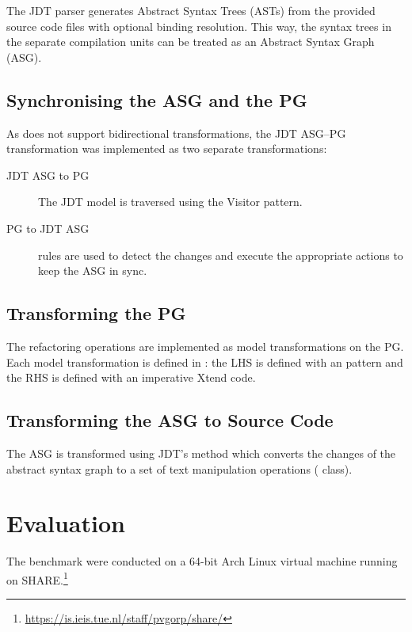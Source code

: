 \documentclass[submission,copyright,creativecommons]{eptcs}
\begin{document}
The JDT parser generates Abstract Syntax Trees (ASTs) from the provided source code files with optional binding resolution. This way, the syntax trees in the separate compilation units can be treated as an Abstract Syntax Graph (ASG).


\subsection{Synchronising the ASG and the PG}

As \viatra does not support bidirectional transformations, the JDT ASG--PG transformation was implemented as two separate transformations:

\begin{description}
\item[JDT ASG to PG] The JDT model is traversed using the Visitor pattern.
\item[PG to JDT ASG] \viatra rules are used to detect the changes and execute the appropriate actions to keep the ASG in sync.
\end{description}

\subsection{Transforming the PG}

The refactoring operations are implemented as model transformations on the PG. Each model transformation is defined in \viatra: the LHS is defined with an \eiq pattern and the RHS is defined with an imperative Xtend code.

\subsection{Transforming the ASG to Source Code}

The ASG is transformed using JDT's  method which converts the changes of the abstract syntax graph to a set of text manipulation operations ( class).

\section{Evaluation}

The benchmark were conducted on a 64-bit Arch Linux virtual machine running on SHARE.\footnote{\url{https://is.ieis.tue.nl/staff/pvgorp/share/}}
\end{document}
